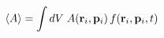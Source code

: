 \documentclass[preview]{standalone}
\begin{document}
\begin{align*}
\special{dvisvgm:raw <g id='unique000'>}\langle A\rangle=\int dV\;A(\va r_i,\va p_i)\,f(\va r_i,\va p_i,t)\special{dvisvgm:raw </g>}
\end{align*}
\end{document}
